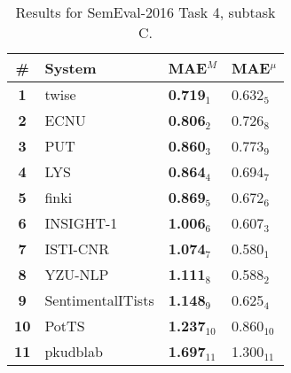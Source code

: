 \begin{table*}[tbh]
\centering
\begin{small}
\renewcommand{\arraystretch}{1.0}%
\begin{tabular}{|c|l|l|l|}
\hline
  \bf \# & \bf System & \bf MAE$^M$ & \bf MAE$^{\mu}$ \\
\hline
\bf 1 & twise & \bf 0.719$_{1}$ & 0.632$_{5}$ \\
\bf 2 & ECNU & \bf 0.806$_{2}$ & 0.726$_{8}$ \\
\bf 3 & PUT & \bf 0.860$_{3}$ & 0.773$_{9}$ \\
\bf 4 & LYS & \bf 0.864$_{4}$ & 0.694$_{7}$ \\
\bf 5 & finki & \bf 0.869$_{5}$ & 0.672$_{6}$ \\
\bf 6 & INSIGHT-1 & \bf 1.006$_{6}$ & 0.607$_{3}$ \\
\bf 7 & ISTI-CNR & \bf 1.074$_{7}$ & 0.580$_{1}$ \\
\bf 8 & YZU-NLP & \bf 1.111$_{8}$ & 0.588$_{2}$ \\
\bf 9 & SentimentalITists & \bf 1.148$_{9}$ & 0.625$_{4}$ \\
\bf 10 & PotTS & \bf 1.237$_{10}$ & 0.860$_{10}$ \\
\bf 11 & pkudblab & \bf 1.697$_{11}$ & 1.300$_{11}$ \\
\hline
\end{tabular}
\caption{Results for SemEval-2016 Task 4, subtask C.}
\label{table:results}
\end{small}
\end{table*}
